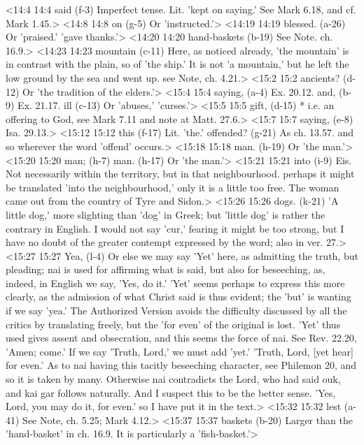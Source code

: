 <14:4 14:4  said (f-3)  Imperfect tense. Lit. 'kept on saying.' See Mark 6.18, and  cf. Mark 1.45.>
<14:8 14:8  on (g-5)  Or 'instructed.'>
<14:19 14:19  blessed. (a-26)  Or 'praised.' 'gave thanks.'>
<14:20 14:20  hand-baskets (b-19)  See Note. ch. 16.9.>
<14:23 14:23  mountain (c-11)  Here, as noticed already, 'the mountain' is in contrast with  the plain, so of 'the ship.' It is not 'a mountain,' but he  left the low ground by the sea and went up. see Note, ch. 4.21.>
<15:2 15:2  ancients? (d-12)  Or 'the tradition of the elders.'>
<15:4 15:4  saying, (a-4)  Ex. 20.12.
  and, (b-9)  Ex. 21.17.
  ill (c-13)  Or 'abuses,' 'curses.'>
<15:5 15:5  gift, (d-15)  * i.e. an offering to God, see Mark 7.11 and note at Matt.  27.6.>
<15:7 15:7  saying, (e-8)  Isa. 29.13.>
<15:12 15:12  this (f-17)  Lit. 'the.'
  offended? (g-21)  As ch. 13.57. and so wherever the word 'offend' occurs.>
<15:18 15:18  man. (h-19) Or 'the man.'>
<15:20 15:20  man; (h-7)  man. (h-17)
  Or 'the man.'>
<15:21 15:21  into (i-9)  Eis. Not necessarily within the territory, but in that  neighbourhood. perhaps it might be translated 'into the  neighbourhood,' only it is a little too free. The woman came  out from the country of Tyre and Sidon.>
<15:26 15:26  dogs. (k-21)  'A little dog,' more slighting than 'dog' in Greek; but  'little dog' is rather the contrary in English. I would not say  'cur,' fearing it might be too strong, but I have no doubt of  the greater contempt expressed by the word; also in ver. 27.>
<15:27 15:27  Yea, (l-4)  Or else we may say 'Yet' here, as admitting the truth, but  pleading; nai is used for affirming what is said, but also  for beseeching, as, indeed, in English we say, 'Yes, do it.'  'Yet' seems perhaps to express this more clearly, as the  admission of what Christ said is thus evident; the 'but' is  wanting if we say 'yea.' The Authorized Version avoids the  difficulty discussed by all the critics by translating freely,  but the 'for even' of the original is lost. 'Yet' thus used  gives assent and obsecration, and this seems the force of  nai. See Rev. 22.20, 'Amen; come.' If we say 'Truth, Lord,'  we must add 'yet.' 'Truth, Lord, [yet hear] for even.' As to  nai having this tacitly beseeching character, see Philemon  20, and so it is taken by many. Otherwise nai contradicts the  Lord, who had said ouk, and kai gar follows naturally. And  I suspect this to be the better sense. 'Yes, Lord, you may do  it, for even.' so I have put it in the text.>
<15:32 15:32  lest (a-41)  See Note, ch. 5.25; Mark 4.12.>
<15:37 15:37  baskets (b-20)  Larger than the 'hand-basket' in ch. 16.9. It is particularly  a 'fish-basket.'>
